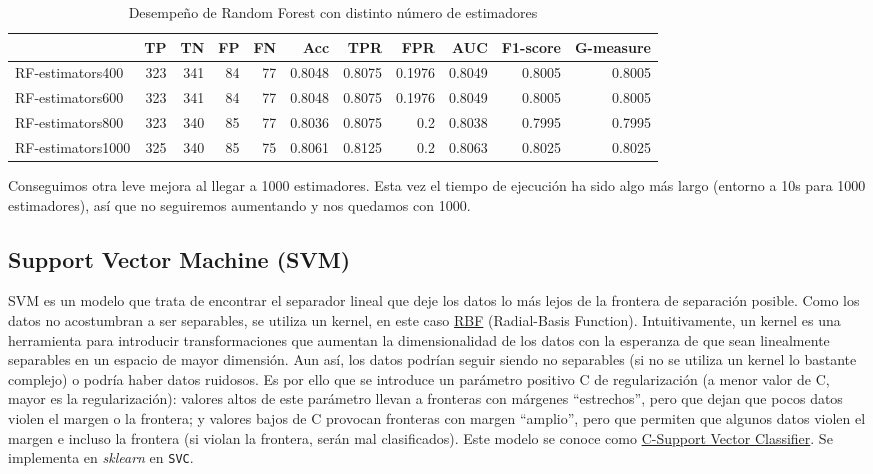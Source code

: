 \documentclass{article}
\begin{document}
\begin{table}[H]
\centering
\caption{Desempeño de Random Forest con distinto número de estimadores}
\label{tab:rf-tuning2}
\begin{tabular}{|lrrrrrrrrrr|}
\hline
 & TP & TN & FP & FN & Acc & TPR & FPR & AUC & F1-score & G-measure\\ \hline
RF-estimators400 & 323 & 341 & 84 & 77 & 0.8048 & 0.8075 & 0.1976 & 0.8049 & 0.8005 & 0.8005\\
RF-estimators600 & 323 & 341 & 84 & 77 & 0.8048 & 0.8075 & 0.1976 & 0.8049 & 0.8005 & 0.8005\\
RF-estimators800 & 323 & 340 & 85 & 77 & 0.8036 & 0.8075 & 0.2 & 0.8038 & 0.7995 & 0.7995\\
RF-estimators1000 & 325 & 340 & 85 & 75 & 0.8061 & 0.8125 & 0.2 & 0.8063 & 0.8025 & 0.8025\\
\hline
\end{tabular}
\end{table}

Conseguimos otra leve mejora al llegar a 1000 estimadores. Esta vez el
tiempo de ejecución ha sido algo más largo (entorno a 10s para 1000
estimadores), así que no seguiremos aumentando y nos quedamos con
1000.

\subsection{Support Vector Machine (SVM)}

SVM es un modelo que trata de encontrar el separador lineal que deje
los datos lo más lejos de la frontera de separación posible. Como los
datos no acostumbran a ser separables, se utiliza un kernel, en este
caso
\href{https://scikit-learn.org/stable/modules/generated/sklearn.gaussian_process.kernels.RBF.html}{RBF}
(Radial-Basis Function). Intuitivamente, un kernel es una herramienta
para introducir transformaciones que aumentan la dimensionalidad de
los datos con la esperanza de que sean linealmente separables en un
espacio de mayor dimensión. Aun así, los datos podrían seguir siendo
no separables (si no se utiliza un kernel lo bastante complejo) o
podría haber datos ruidosos. Es por ello que se introduce un parámetro
positivo C de regularización (a menor valor de C, mayor es la
regularización): valores altos de este parámetro llevan a fronteras
con márgenes ``estrechos'', pero que dejan que pocos datos violen el
margen o la frontera; y valores bajos de C provocan fronteras con
margen ``amplio'', pero que permiten que algunos datos violen el
margen e incluso la frontera (si violan la frontera, serán mal
clasificados). Este modelo se conoce como
\href{https://medium.com/@pushkarmandot/what-is-the-significance-of-c-value-in-support-vector-machine-28224e852c5a}{C-Support
  Vector Classifier}. Se implementa en \textit{sklearn} en
\texttt{SVC}.
\end{document}
